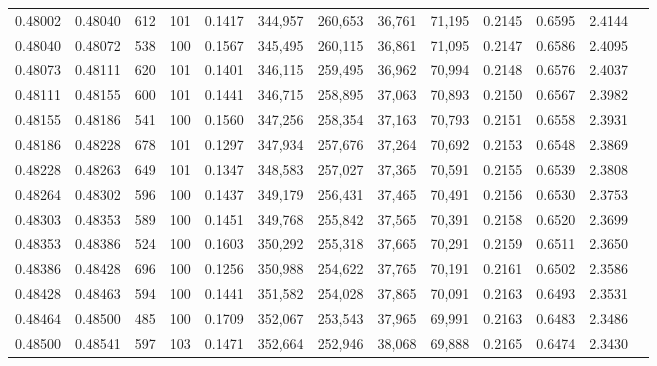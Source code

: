 \begin{tabular}{rrrrrrrrrrrrr}
0.48002 & 0.48040 &   612 & 101 &                                     0.1417 & 344,957 & 260,653 &  36,761 &  71,195 & 0.2145 & 0.6595 & 2.4144 \\
0.48040 & 0.48072 &   538 & 100 &                                     0.1567 & 345,495 & 260,115 &  36,861 &  71,095 & 0.2147 & 0.6586 & 2.4095 \\
0.48073 & 0.48111 &   620 & 101 &                                     0.1401 & 346,115 & 259,495 &  36,962 &  70,994 & 0.2148 & 0.6576 & 2.4037 \\
0.48111 & 0.48155 &   600 & 101 &                                     0.1441 & 346,715 & 258,895 &  37,063 &  70,893 & 0.2150 & 0.6567 & 2.3982 \\
0.48155 & 0.48186 &   541 & 100 &                                     0.1560 & 347,256 & 258,354 &  37,163 &  70,793 & 0.2151 & 0.6558 & 2.3931 \\
0.48186 & 0.48228 &   678 & 101 &                                     0.1297 & 347,934 & 257,676 &  37,264 &  70,692 & 0.2153 & 0.6548 & 2.3869 \\
0.48228 & 0.48263 &   649 & 101 &                                     0.1347 & 348,583 & 257,027 &  37,365 &  70,591 & 0.2155 & 0.6539 & 2.3808 \\
0.48264 & 0.48302 &   596 & 100 &                                     0.1437 & 349,179 & 256,431 &  37,465 &  70,491 & 0.2156 & 0.6530 & 2.3753 \\
0.48303 & 0.48353 &   589 & 100 &                                     0.1451 & 349,768 & 255,842 &  37,565 &  70,391 & 0.2158 & 0.6520 & 2.3699 \\
0.48353 & 0.48386 &   524 & 100 &                                     0.1603 & 350,292 & 255,318 &  37,665 &  70,291 & 0.2159 & 0.6511 & 2.3650 \\
0.48386 & 0.48428 &   696 & 100 &                                     0.1256 & 350,988 & 254,622 &  37,765 &  70,191 & 0.2161 & 0.6502 & 2.3586 \\
0.48428 & 0.48463 &   594 & 100 &                                     0.1441 & 351,582 & 254,028 &  37,865 &  70,091 & 0.2163 & 0.6493 & 2.3531 \\
0.48464 & 0.48500 &   485 & 100 &                                     0.1709 & 352,067 & 253,543 &  37,965 &  69,991 & 0.2163 & 0.6483 & 2.3486 \\
0.48500 & 0.48541 &   597 & 103 &                                     0.1471 & 352,664 & 252,946 &  38,068 &  69,888 & 0.2165 & 0.6474 & 2.3430 \\

\end{tabular}
